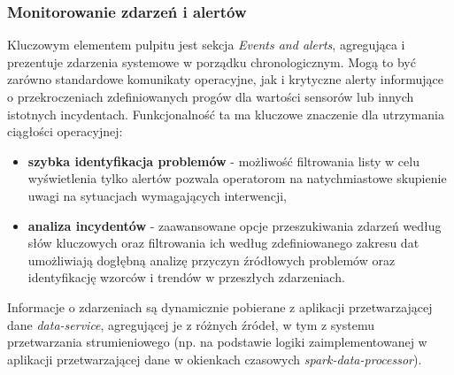 \subsubsection{Monitorowanie zdarzeń i alertów}
Kluczowym elementem pulpitu jest sekcja \textit{Events and alerts}, agregująca i prezentuje zdarzenia systemowe w porządku chronologicznym. Mogą to być zarówno standardowe komunikaty operacyjne, jak i krytyczne alerty informujące o przekroczeniach zdefiniowanych progów dla wartości sensorów lub innych istotnych incydentach. Funkcjonalność ta ma kluczowe znaczenie dla utrzymania ciągłości operacyjnej:
\vspace{0.3em}
\begin{itemize}
    \item \textbf{szybka identyfikacja problemów} - możliwość filtrowania listy w celu wyświetlenia tylko alertów pozwala operatorom na natychmiastowe skupienie uwagi na sytuacjach wymagających interwencji,
    \item \textbf{analiza incydentów} - zaawansowane opcje przeszukiwania zdarzeń według słów kluczowych oraz filtrowania ich według zdefiniowanego zakresu dat umożliwiają dogłębną analizę przyczyn źródłowych problemów oraz identyfikację wzorców i trendów w przeszłych zdarzeniach.
\end{itemize}
\vspace{0.3em}
Informacje o zdarzeniach są dynamicznie pobierane z aplikacji przetwarzającej dane \textit{data-service}, agregującej je z różnych źródeł, w tym z systemu przetwarzania strumieniowego (np. na podstawie logiki zaimplementowanej w aplikacji przetwarzającej dane w okienkach czasowych \textit{spark-data-processor}).

